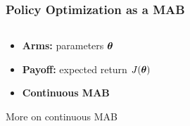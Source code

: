 \documentclass[aspectratio=169, table]{beamer}
\newcommand{\enb}[1]{\textcolor{poliblue1}{\textbf{#1}}}
\newcommand{\eno}[1]{\textcolor{orangep}{\textbf{#1}}}
\begin{document}
\begin{frame} 
\frametitle{Policy Optimization as a MAB } 
\begin{columns}
\begin{column}{.65\textwidth}
\begin{overlayarea}{\textwidth}{.75\textheight}
\begin{itemize}
	\setlength{\itemsep}{20pt}
	\item<1-> \enb{Arms:} parameters $\boldsymbol{\theta}$\vfill
	\item<2-> \enb{Payoff:} expected return $J(\boldsymbol{\theta})$\vfill
	\item<3-> \eno{Continuous MAB}~\citep{kleinberg2013bandits}\vfill
\end{itemize}
More on continuous MAB
\end{overlayarea}
\end{column}
\begin{column}{.65\textwidth}
\begin{overlayarea}{\textwidth}{\textheight}
\end{overlayarea}
\end{column}
\end{columns}
\end{frame}
\end{document}

